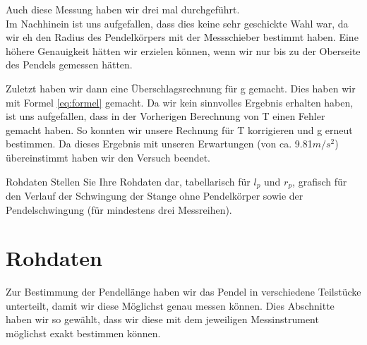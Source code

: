 \documentclass[twoside]{protokoll}
\begin{document}
Auch diese Messung haben wir drei mal durchgeführt.\\
Im Nachhinein ist uns aufgefallen, dass dies keine sehr geschickte Wahl war, da wir eh den Radius des Pendelkörpers mit der Messschieber bestimmt haben.
Eine höhere Genauigkeit hätten wir erzielen können, wenn wir nur bis zu der Oberseite des Pendels gemessen hätten. 

Zuletzt haben wir dann eine Überschlagsrechnung für g gemacht. Dies haben wir mit Formel \ref{eq:formel} gemacht.
Da wir kein sinnvolles Ergebnis erhalten haben, ist uns aufgefallen, dass in der Vorherigen Berechnung von T einen Fehler gemacht haben. 
So konnten wir unsere Rechnung für T korrigieren und g erneut bestimmen. Da dieses Ergebnis mit unseren Erwartungen (von ca. 9.81$m/s^2$) übereinstimmt haben wir den Versuch beendet.

\begin{aufgabe}{Rohdaten}
  Stellen Sie Ihre Rohdaten dar, tabellarisch für $l_p$ und $r_p$,
  grafisch für den Verlauf der Schwingung der Stange ohne Pendelkörper
  sowie der Pendelschwingung (für mindestens drei Messreihen).
\end{aufgabe}

\section{Rohdaten}
Zur Bestimmung der Pendellänge haben wir das Pendel in verschiedene Teilstücke unterteilt, damit wir diese Möglichst genau messen können. 
Dies Abschnitte haben wir so gewählt, dass wir diese mit dem jeweiligen Messinstrument möglichst exakt bestimmen können. 
\end{document}
